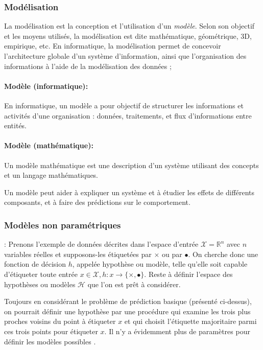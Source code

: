 	
	\subsubsection{Modélisation}\label{sec:modelisation}
	La modélisation est la conception et l'utilisation d'un \textit{modèle}. Selon son objectif et les moyens utilisés, la modélisation est dite mathématique, géométrique, 3D, empirique, etc. 
	En informatique, la modélisation permet de concevoir l'architecture globale d'un système d'information, ainsi que l'organisation des informations à l'aide de la modélisation des données ;
	
	\paragraph*{Modèle (informatique):} En informatique, un modèle a pour objectif de structurer les informations et activités d'une organisation : données, traitements, et flux d'informations entre entités.
	
	\paragraph*{Modèle (mathématique):} Un modèle mathématique est une description d'un système utilisant des concepts et un langage mathématiques.
	
	Un modèle peut aider à expliquer un système et à étudier les effets de différents composants, et à faire des prédictions sur le comportement.
	
	\subsubsection*{Modèles non paramétriques}
	
	
	\Eg: Prenons l'exemple de données décrites dans l'espace d'entrée $\mathcal{X} = \mathbb{R}^n$ avec $n$ variables réelles et supposons-les étiquetées par $\times$ ou par $\bullet$. On cherche donc une fonction de décision $h$, appelée hypothèse ou modèle, telle qu'elle soit capable d'étiqueter toute entrée 
	$x \in \mathcal{X}, h: x \rightarrow \{\times,\bullet\}$. Reste à définir l'espace des hypothèses ou modèles $\mathcal{H}$ que l'on est prêt à considérer.
	
	Toujours en considérant le problème de prédiction basique (présenté ci-dessus), on pourrait définir une hypothèse par une procédure qui examine les trois plus proches voisins du point à étiqueter $x$ et qui choisit l'étiquette majoritaire parmi ces trois points pour étiqueter $x$. Il n'y a évidemment plus de paramètres pour définir les modèles possibles \cite[p. 24]{antoine2018apprentissage}.
	
